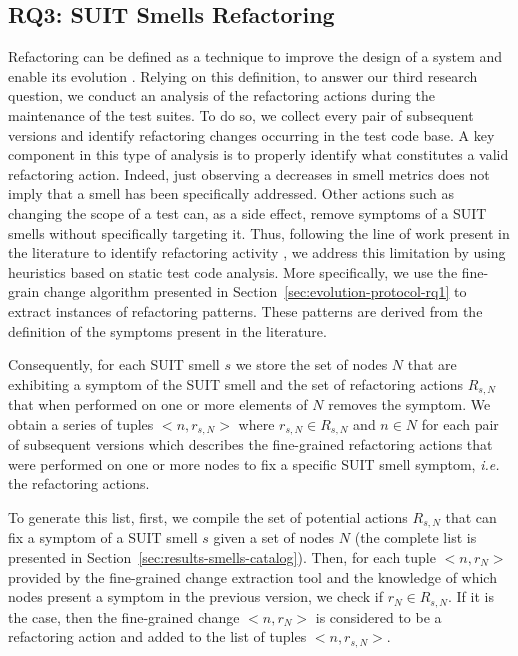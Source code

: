 \subsection{RQ3: SUIT Smells Refactoring}
\label{sec:methodology-smell-evolution}

Refactoring can be defined as a technique to improve the design of a system and enable its evolution \cite{Fowler1999}. Relying on this definition, to answer our third research question, we conduct an analysis of the refactoring actions during the maintenance of the test suites. To do so, we collect every pair of subsequent versions and identify refactoring changes occurring in the test code base. A key component in this type of analysis is to properly identify what constitutes a valid refactoring action. Indeed, just observing a decreases in smell metrics does not imply that a smell has been specifically addressed. Other actions such as changing the scope of a test can, as a side effect, remove symptoms of a SUIT smells without specifically targeting it. Thus, following the line of work present in the literature to identify refactoring activity \cite{Tsantalis2013, Silva2017}, we address this limitation by using heuristics based on static test code analysis. More specifically, we use the fine-grain change algorithm presented in Section~\ref{sec:evolution-protocol-rq1} to extract instances of refactoring patterns. These patterns are derived from the definition of the symptoms present in the literature.

Consequently, for each SUIT smell $s$ we store the set of nodes $N$ that are exhibiting a symptom of the SUIT smell and the set of refactoring actions $R_{s,N}$ that when performed on one or more elements of $N$ removes the symptom. We obtain a series of tuples $<n, r_{s,N}>$ where $r_{s,N} \in R_{s,N}$ and $n \in N$ for each pair of subsequent versions which describes the fine-grained refactoring actions that were performed on one or more nodes to fix a specific SUIT smell symptom, \emph{i.e.} the refactoring actions. 

To generate this list, first, we compile the set of potential actions $R_{s,N}$ that can fix a symptom of a SUIT smell $s$ given a set of nodes $N$ (the complete list is presented in Section~\ref{sec:results-smells-catalog}). Then, for each tuple $<n, r_{N}>$ provided by the fine-grained change extraction tool and the knowledge of which nodes present a symptom in the previous version, we check if $r_{N} \in R_{s,N}$. If it is the case, then the fine-grained change $<n, r_{N}>$ is considered to be a refactoring action and added to the list of tuples $<n, r_{s,N}>$.

